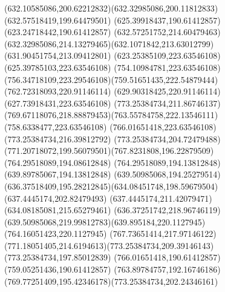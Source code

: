 {{\curveto(632.10585086,200.62212832)(632.32985086,200.11812833)(632.57518419,199.64479501)
\lineto(625.39918437,190.61412857)
\lineto(623.24718442,190.61412857)
\closepath
\moveto(632.57251752,214.60479463)
\curveto(632.32985086,214.13279465)(632.1071842,213.63012799)(631.90451754,213.09412801)
\lineto(623.25385109,223.63546108)
\lineto(625.39785103,223.63546108)
\closepath
\moveto(754.10984781,223.63546108)
\curveto(756.34718109,223.29546108)(759.51651435,222.54879444)(762.72318093,220.91146114)
\lineto(629.90318425,220.91146114)
\lineto(627.73918431,223.63546108)
\closepath
\moveto(773.25384734,211.86746137)
\curveto(769.67118076,218.88879453)(763.55784758,222.13546111)(758.6338477,223.63546108)
\lineto(766.01651418,223.63546108)
\lineto(773.25384734,216.39812792)
\closepath
\moveto(773.25384734,204.72479488)
\curveto(771.20718072,199.56079501)(767.8231808,196.22879509)(764.29518089,194.08612848)
\lineto(764.29518089,194.13812848)
\lineto(639.89785067,194.13812848)
\curveto(639.50985068,194.25279514)(636.37518409,195.28212845)(634.08451748,198.59679504)
\lineto(637.4445174,202.82479493)
\lineto(637.4445174,211.42079471)
\lineto(634.08185081,215.65279461)
\curveto(636.37251742,218.96746119)(639.50985068,219.99812783)(639.895184,220.1127945)
\lineto(764.16051423,220.1127945)
\curveto(767.73651414,217.97146122)(771.18051405,214.6194613)(773.25384734,209.39146143)
\closepath
\moveto(773.25384734,197.85012839)
\lineto(766.01651418,190.61412857)
\lineto(759.05251436,190.61412857)
\curveto(763.89784757,192.16746186)(769.77251409,195.42346178)(773.25384734,202.24346161)
\closepath
}
}
{
}
